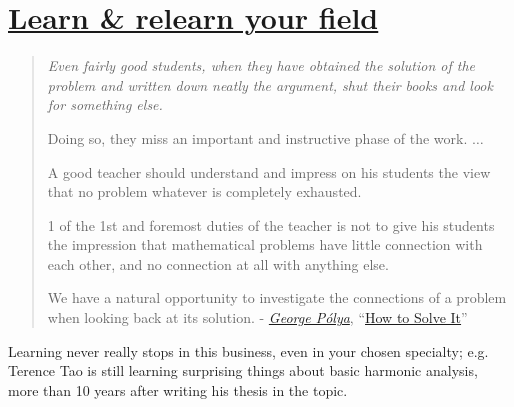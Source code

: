 \documentclass{book}
\numberwithin{equation}{section}
\begin{document}
\section{\href{https://terrytao.wordpress.com/career-advice/learn-and-relearn-your-field/}{Learn \& relearn your field}}
\begin{quotation}
    \it
    Even fairly good students, when they have obtained the solution of the problem and written down neatly the argument, shut their books and look for something else.
    
    Doing so, they miss an important and instructive phase of the work. $\ldots$
    
    A good teacher should understand and impress on his students the view that no problem whatever is completely exhausted.
    
    1 of the 1st and foremost duties of the teacher is not to give his students the impression that mathematical problems have little connection with each other, and no connection at all with anything else.
    
    We have a natural opportunity to investigate the connections of a problem when looking back at its solution. - \href{http://en.wikipedia.org/wiki/George_P%C3%B3lya}{\emph{George Pólya}}, ``\href{http://en.wikipedia.org/wiki/How_to_Solve_It}{How to Solve It}''
\end{quotation}
Learning never really stops in this business, even in your chosen specialty; e.g. Terence Tao is still learning surprising things about basic harmonic analysis, more than 10 years after writing his thesis in the topic.
\end{document}
